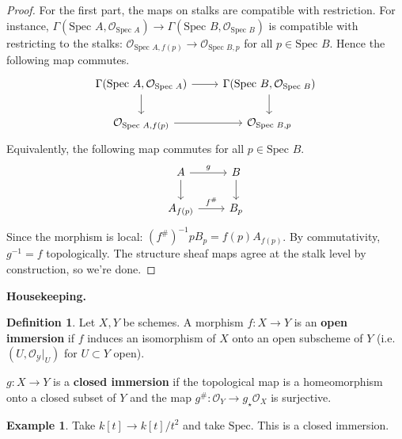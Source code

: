 \documentclass{article}
\theoremstyle{definition}
\newtheorem{example}{Example}[section]
\newtheorem{defn}{Definition}[section]
\begin{document}
\begin{proof}
    For the first part, the maps on stalks are compatible with restriction. For instance, $\Gamma(\text{Spec }A, \mathcal{O}_{\text{Spec }A}) \to \Gamma(\text{Spec }B, \mathcal{O}_{\text{Spec }B})$ is compatible with restricting to the stalks: $\mathcal{O}_{\text{Spec }A,f(p)} \to \mathcal{O}_{\text{Spec }B,p}$ for all $p \in \text{Spec }B$. Hence the following map commutes.
    \[\begin{tikzcd}[]
        \Gamma(\text{Spec }A, \mathcal{O}_{\text{Spec }A}) & \Gamma(\text{Spec }B, \mathcal{O}_{\text{Spec }B})\\
        \mathcal{O}_{\text{Spec }A,f(p)} & \mathcal{O}_{\text{Spec }B,p}
        \arrow["", from=1-1, to=1-2]
        \arrow["",from=1-1, to=2-1]
        \arrow["", from=1-2, to=2-2]
        \arrow["", from=2-1, to=2-2]
    \end{tikzcd}\]
    Equivalently, the following map commutes for all $p \in \text{Spec }B$.
    \[\begin{tikzcd}[]
        A & B \\
        A_{f(p)} & B_p
        \arrow["g", from=1-1, to=1-2]
        \arrow["",from=1-1, to=2-1]
        \arrow["", from=1-2, to=2-2]
        \arrow["f^\#", from=2-1, to=2-2]
    \end{tikzcd}\]
    Since the morphism is local: $(f^\#)^{-1} p B_p = f(p) A_{f(p)}$. By commutativity, $g^{-1} = f$ topologically. The structure sheaf maps agree at the stalk level by construction, so we're done.
\end{proof}

\textbf{Housekeeping.} 

\begin{defn}
    Let $X,Y$ be schemes. A morphism $f : X \to Y$ is an \textbf{open immersion} if $f$ induces an isomorphism of $X$ onto an open subscheme of $Y$ (i.e. $(U, \mathcal{O_Y}|_U)$ for $U \subset Y$ open).
    \vspace{1mm}
     
    $g : X \to Y$ is a \textbf{closed immersion} if the topological map is a homeomorphism onto a closed subset of $Y$ and the map $g^\# : \mathcal{O}_Y \to g_{\star}\mathcal{O}_X$ is surjective.
\end{defn}
\begin{example}
    Take $k[t] \to k[t]/t^2$ and take $\text{Spec}$. This is a closed immersion.
\end{example}

\end{document}

